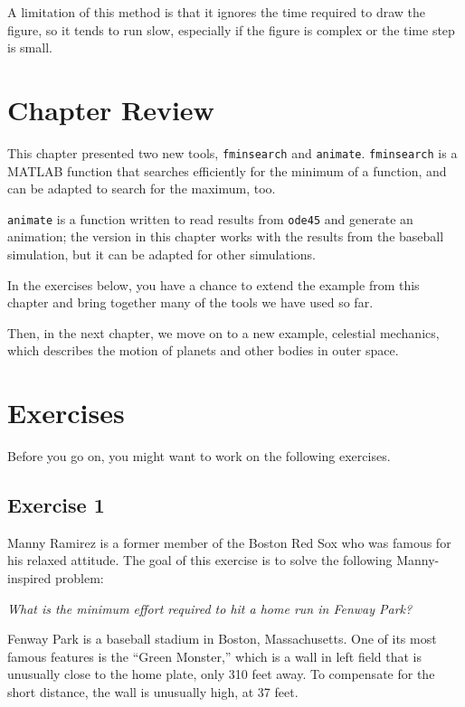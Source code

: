 A limitation of this method is that it ignores the time required to
draw the figure, so it tends to run slow, especially if the figure is
complex or the time step is small.

\section{Chapter Review}

This chapter presented two new tools, \lstinline{fminsearch} and \lstinline{animate}.  
\lstinline{fminsearch} is a MATLAB function that searches efficiently for the minimum of a function, and can be adapted to search for the maximum, too.

\lstinline{animate} is a function written to read results from \lstinline{ode45} and generate an animation; the version in this chapter works with the results from the baseball simulation, but it can be adapted for other simulations.

In the exercises below, you have a chance to extend the example from this chapter and bring together many of the tools we have used so far.

Then, in the next chapter, we move on to a new example, celestial mechanics, which describes the motion of planets and other bodies in outer space.


\section{Exercises}

Before you go on, you might want to work on the following exercises.

\subsection{Exercise 1}


Manny Ramirez is a former member of the Boston Red Sox who was famous for his relaxed attitude.  The goal of this exercise is to solve the following Manny-inspired problem:

{\it What is the minimum effort required to hit a home run in Fenway Park?}


Fenway Park is a baseball stadium in Boston, Massachusetts.  One of its most famous features is the ``Green Monster,'' which is a wall in left field that is unusually close to the home plate, only 310 feet away.  To compensate for the short distance, the wall is unusually high, at 37 feet.

